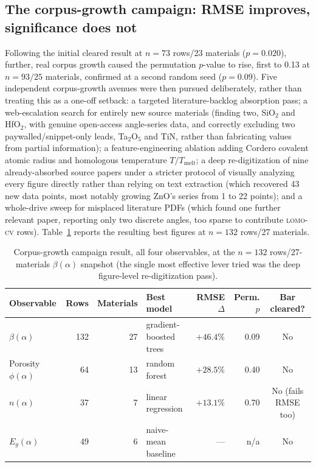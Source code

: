 \documentclass[aip,amsmath,amssymb,reprint]{revtex4-1}
\newcommand{\lomo}{\textsc{lomo-cv}}
\begin{document}
\subsection{The corpus-growth campaign: RMSE improves, significance does not}
\label{ssec:corpus_growth}

Following the initial cleared result at $n=73$ rows/23 materials
($p=0.020$), further, real corpus growth caused the permutation
$p$-value to rise, first to 0.13 at $n=93/25$ materials, confirmed at
a second random seed ($p=0.09$). Five independent corpus-growth
avenues were then pursued deliberately, rather than treating this as
a one-off setback: a targeted literature-backlog absorption pass; a
web-escalation search for entirely new source materials (finding two,
SiO$_2$ and HfO$_2$, with genuine open-access angle-series data, and
correctly excluding two paywalled/snippet-only leads, Ta$_2$O$_5$ and
TiN, rather than fabricating values from partial information); a
feature-engineering ablation adding Cordero covalent atomic radius and
homologous temperature $T/T_{\mathrm{melt}}$; a deep re-digitization of
nine already-absorbed source papers under a stricter protocol of
visually analyzing every figure directly rather than relying on text
extraction (which recovered 43 new data points, most notably growing
ZnO's series from 1 to 22 points); and a whole-drive sweep for
misplaced literature PDFs (which found one further relevant paper,
reporting only two discrete angles, too sparse to contribute \lomo{}
rows). Table~\ref{tab:corpus_growth} reports the resulting best
figures at $n=132$ rows/27 materials.

\begin{table}[htbp]
  \centering
  \caption{Corpus-growth campaign result, all four observables, at
    the $n=132$ rows/27-materials $\beta(\alpha)$ snapshot (the single
    most effective lever tried was the deep figure-level
    re-digitization pass).}
  \label{tab:corpus_growth}
  \begin{tabular}{lrrlrrc}
    \toprule
    Observable & Rows & Materials & Best model & RMSE $\Delta$ & Perm. $p$ & Bar cleared? \\
    \midrule
    $\beta(\alpha)$          & 132 & 27 & gradient-boosted trees & $+46.4\%$ & 0.09 & No \\
    Porosity $\phi(\alpha)$  & 64  & 13 & random forest          & $+28.5\%$ & 0.40 & No \\
    $n(\alpha)$              & 37  & 7  & linear regression      & $+13.1\%$ & 0.70 & No (fails RMSE too) \\
    $E_g(\alpha)$            & 49  & 6  & naive-mean baseline    & ---       & n/a  & No \\
    \bottomrule
  \end{tabular}
\end{table}
\end{document}
